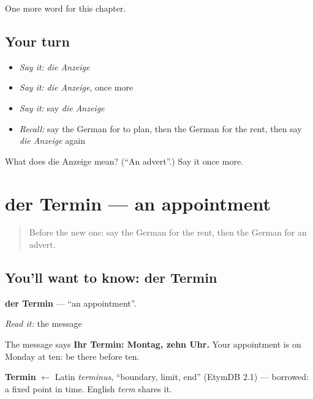 \begin{grammarlens}[title={What you've built}]
One more word for this chapter.
\end{grammarlens}

\subsection*{Your turn}
\begin{itemize}
\raggedright
  \item \emph{Say it:} \emph{die Anzeige}
  \item \emph{Say it:} \emph{die Anzeige}, once more
  \item \emph{Say it:} say \emph{die Anzeige}
  \item \emph{Recall:} say the German for to plan, then the German for the rent, then say \emph{die Anzeige} again
\end{itemize}

\begin{tcolorbox}[breakable,colback=teal!4,colframe=teal!35!black,title={Before you move on}]
What does die Anzeige mean? (\textquotedblleft{}An advert\textquotedblright{}.) Say it once more.
\end{tcolorbox}
\section[der Termin]{der Termin — an appointment}

\label{lesson:GE-C143-termin}



\begin{quote}
Before the new one: say the German for the rent, then the German for an advert.
\end{quote}

\subsection*{You'll want to know: der Termin}
\textbf{der Termin} — \textquotedblleft{}an appointment\textquotedblright{}.

\emph{Read it:} the message

The message says \textbf{Ihr Termin: Montag, zehn Uhr.} Your appointment is on Monday at ten: be there before ten.

\begin{cousinweb}
\textbf{Termin} $\leftarrow$ Latin \emph{terminus}, \textquotedblleft{}boundary, limit, end\textquotedblright{} (EtymDB 2.1) — borrowed: a fixed point in time. English \emph{term} shares it.
\end{cousinweb}


